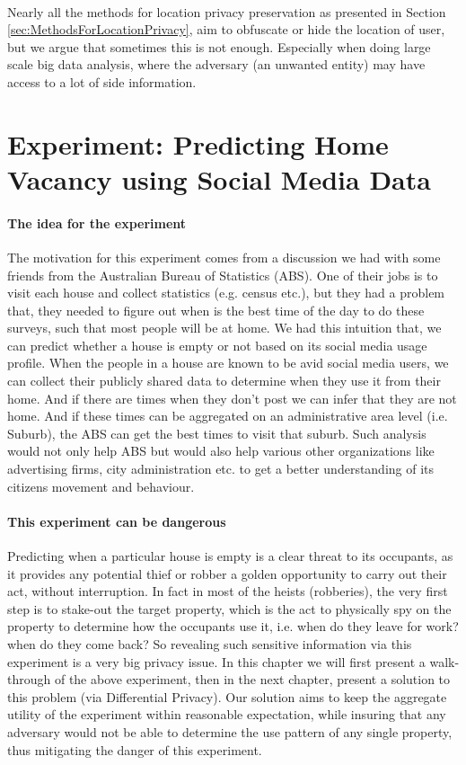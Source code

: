 \documentclass[12pt]{report}
\theoremstyle{named}
\begin{document}
\paragraph{}
Nearly all the methods for location privacy preservation as presented in Section \ref{sec:MethodsForLocationPrivacy}, aim to obfuscate or hide the location of user, but we argue that sometimes this is not enough. Especially when doing large scale big data analysis, where the adversary (an unwanted entity) may have access to a lot of side information. 

\section{Experiment: Predicting Home Vacancy using Social Media Data}
\paragraph{The idea for the experiment\\}
The motivation for this experiment comes from a discussion we had with some friends from the Australian Bureau of Statistics (ABS). One of their jobs is to visit each house and collect statistics (e.g. census etc.), but they had a problem that, they needed to figure out when is the best time of the day to do these surveys, such that most people will be at home. We had this intuition that, we can predict whether a house is empty or not based on its social media usage profile. When the people in a house are known to be avid social media users, we can collect their publicly shared data to determine when they use it from their home. And if there are times when they don't post we can infer that they are not home. And if these times can be aggregated on an administrative area level (i.e. Suburb), the ABS can get the best times to visit that suburb. Such analysis would not only help ABS but would also help various other organizations like advertising firms, city administration etc. to get a better understanding of its citizens movement and behaviour.
\paragraph{This experiment can be dangerous\\}
Predicting when a particular house is empty is a clear threat to its occupants, as it provides any potential thief or robber a golden opportunity to carry out their act, without interruption. In fact in most of the heists (robberies), the very first step is to stake-out the target property, which is the act to physically spy on  the property to determine how the occupants use it, i.e. when do they leave for work? when do they come back? So revealing such sensitive information via this experiment is a very big privacy issue. In this chapter we will first present a walk-through of the above experiment, then in the next chapter, present a solution to this problem (via Differential Privacy). Our solution aims to keep the aggregate utility of the experiment within reasonable expectation, while insuring that any adversary would not be able to determine the use pattern of any single property, thus mitigating the danger of this experiment.
\end{document}
